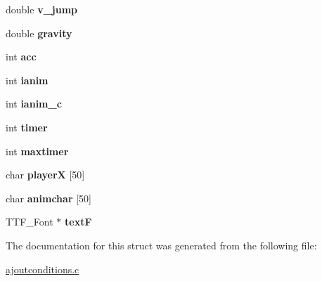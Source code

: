 \begin{DoxyCompactItemize}
\item 
double {\bfseries v\+\_\+jump}\hypertarget{structperso_a26ad027d7b76973535e7969482725da6}{}\label{structperso_a26ad027d7b76973535e7969482725da6}

\item 
double {\bfseries gravity}\hypertarget{structperso_a4c95e3d16f0d4eae52c1187d6ddfd573}{}\label{structperso_a4c95e3d16f0d4eae52c1187d6ddfd573}

\item 
int {\bfseries acc}\hypertarget{structperso_a1a32aa71194817603bd160c2b9cbf197}{}\label{structperso_a1a32aa71194817603bd160c2b9cbf197}

\item 
int {\bfseries ianim}\hypertarget{structperso_a4674f7d91c33283d7b7e7772fb00de13}{}\label{structperso_a4674f7d91c33283d7b7e7772fb00de13}

\item 
int {\bfseries ianim\+\_\+c}\hypertarget{structperso_afe1ee12c60466189e822f1edff0c49b1}{}\label{structperso_afe1ee12c60466189e822f1edff0c49b1}

\item 
int {\bfseries timer}\hypertarget{structperso_ab032e3ba9ddeb4e51ff9a6c2ccfc6974}{}\label{structperso_ab032e3ba9ddeb4e51ff9a6c2ccfc6974}

\item 
int {\bfseries maxtimer}\hypertarget{structperso_a17c1c31df790c449d6ca2745479caf9d}{}\label{structperso_a17c1c31df790c449d6ca2745479caf9d}

\item 
char {\bfseries playerX} \mbox{[}50\mbox{]}\hypertarget{structperso_ae3fc2ec8c3c4467de79660c795df383d}{}\label{structperso_ae3fc2ec8c3c4467de79660c795df383d}

\item 
char {\bfseries animchar} \mbox{[}50\mbox{]}\hypertarget{structperso_aefd47a77481e0495003239f70c62a829}{}\label{structperso_aefd47a77481e0495003239f70c62a829}

\item 
T\+T\+F\+\_\+\+Font $\ast$ {\bfseries textF}\hypertarget{structperso_afce99f59fe877aaceae0279e4c4b35a2}{}\label{structperso_afce99f59fe877aaceae0279e4c4b35a2}

\end{DoxyCompactItemize}


The documentation for this struct was generated from the following file\+:\begin{DoxyCompactItemize}
\item 
\hyperlink{ajoutconditions_8c}{ajoutconditions.\+c}\end{DoxyCompactItemize}
